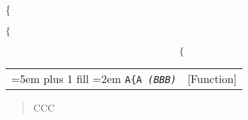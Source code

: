 \documentclass{book}
\begin{document}
\{

$\{$

$$
\{
$$

\index[cp]{\textbraceleft{}}%

\index[cp]{$\lbrace{}$}%

%


\noindent\begin{tabularx}{\linewidth}{@{}Xr}
\rightskip=5em plus 1 fill
\hangindent=2em
\texttt{A\{A \EmbracOn{}\textnormal{\textsl{(BBB)}}\EmbracOff{}}& [Function]
\end{tabularx}

%
\begin{quote}
\unskip{\parskip=0pt\noindent}%
CCC
\end{quote}
\end{document}
